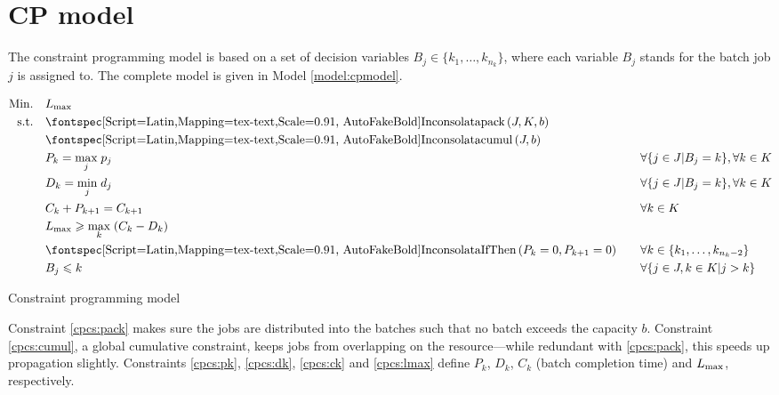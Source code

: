 \documentclass[13pt, letterpaper, oneside]{book}
\begin{document}
\section{CP model}\label{sec:cpmodel}
The constraint programming model is based on a set of decision variables $B_j
\in \{k_1, \dots, k_{n_k} \}$, where each variable $B_j$ stands for the batch job $j$ is
assigned to. The complete model is given in Model \ref{model:cpmodel}.
\begin{model}
\begin{alignat}{2}
\mathrm{Min.}\quad & \Lmax && \\
\mathrm{s.t.}\quad & \label{cpcs:pack} \mathtt{pack}(J, K, b) && \\
& \label{cpcs:cumul} \mathtt{cumul}(J, b) && \\
& \label{cpcs:pk} P_k = \underset{j}{\max} \; p_j \quad && \forall \{j \in J
| B_j = k\}, \forall k \in K \\
& \label{cpcs:dk} D_k = \underset{j}{\min} \; d_j \quad && \forall \{j \in J
| B_j = k\}, \forall k \in K \\
& \label{cpcs:ck} C_k + P_{k+1} = C_{k+1} \quad && \forall k \in K \\
& \label{cpcs:lmax} \Lmax \geq \underset{k}{\max} \; (C_k - D_k) && \\
& \label{cpcs:empty} \mathtt{IfThen}(P_k = 0, P_{k+1} = 0) \quad && \forall k
\in \{ k_1, \dots, k_{n_k - 2}\} \\
& \label{cpcs:pp} B_j \leq k \quad && \forall \{ j \in J, k \in K | j > k \}
\end{alignat}
\caption{Constraint programming model}
\label{model:cpmodel}
\end{model}

Constraint \eqref{cpcs:pack} makes sure the jobs are distributed into the
batches such that no batch exceeds the capacity $b$. Constraint
\eqref{cpcs:cumul}, a global cumulative constraint, keeps jobs from overlapping
on the resource---while redundant with \eqref{cpcs:pack}, this speeds up
propagation slightly. Constraints \eqref{cpcs:pk}, \eqref{cpcs:dk},
\eqref{cpcs:ck} and \eqref{cpcs:lmax} define $P_k$, $D_k$, $C_k$ (batch
completion time) and $L_{\text{max}}$, respectively.
\end{document}
